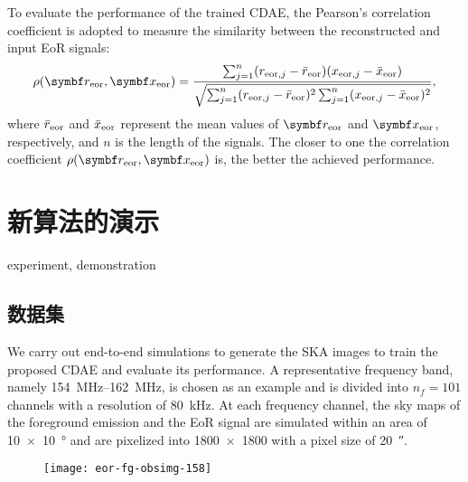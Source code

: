 To evaluate the performance of the trained CDAE,
the Pearson's correlation coefficient
\cite{harker2009,chapman2013}
is adopted to measure the similarity between the reconstructed and input
EoR signals:
\begin{equation}
  \label{eq:corrcoef}
  \rho(\B{r}_{\R{eor}}, \B{x}_{\R{eor}})
      = \frac{\sum_{j=1}^{n}(r_{\R{eor},j} - \bar{r}_{\R{eor}})
      (x_{\R{eor},j} - \bar{x}_{\R{eor}})}{
        \sqrt{\sum_{j=1}^{n}(r_{\R{eor},j} - \bar{r}_{\R{eor}})^2
          \sum_{j=1}^{n}(x_{\R{eor},j} - \bar{x}_{\R{eor}})^2}
    },
\end{equation}
where
$\bar{r}_{\mathrm{eor}}$ and $\bar{x}_{\mathrm{eor}}$ represent the mean
values of $\B{r}_{\R{eor}}$ and $\B{x}_{\R{eor}}$, respectively, and $n$
is the length of the signals.
The closer to one the correlation coefficient
$\rho(\B{r}_{\R{eor}}, \B{x}_{\R{eor}})$ is,
the better the achieved performance.


\section{新算法的演示}

experiment, demonstration

\subsection{数据集}
\label{sec:cdae-dataset}

We carry out end-to-end simulations to generate the SKA images to
train the proposed CDAE and evaluate its performance.
A representative frequency band, namely \SIrange{154}{162}{\MHz}, is chosen
as an example \cite{datta2010} and is divided into $n_f = 101$
channels with a resolution of \SI{80}{\kHz}.
At each frequency channel, the sky maps of the foreground emission and the
EoR signal are simulated within an area of \SI{10 x 10}{\degree} and are
pixelized into \num{1800 x 1800} with a pixel size of \SI{20}{\arcsecond}.

\begin{figure}[htp]
  \centering
  \texttt{[image: eor-fg-obsimg-158]}
  \label{fig:eor-fg-obsimg}
\end{figure}

